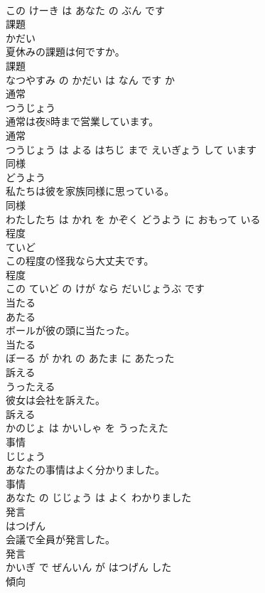 \documentclass[8pt]{extreport}
\begin{document}
\begin{CJK}{UTF8}{min}
\\	この けーき は あなた の ぶん です			
\\	課題	
\\	かだい			
\\	夏休みの課題は何ですか。	
\\	課題 
\\	なつやすみ の かだい は なん です か			
\\	通常	
\\	つうじょう			
\\	通常は夜8時まで営業しています。	
\\	通常 
\\	つうじょう は よる はちじ まで えいぎょう して います			
\\	同様	
\\	どうよう			
\\	私たちは彼を家族同様に思っている。	
\\	同様 
\\	わたしたち は かれ を かぞく どうよう に おもって いる			
\\	程度	
\\	ていど			
\\	この程度の怪我なら大丈夫です。	
\\	程度 
\\	この ていど の けが なら だいじょうぶ です			
\\	当たる	
\\	あたる			
\\	ボールが彼の頭に当たった。	
\\	当たる 
\\	ぼーる が かれ の あたま に あたった			
\\	訴える	
\\	うったえる			
\\	彼女は会社を訴えた。	
\\	訴える 
\\	かのじょ は かいしゃ を うったえた			
\\	事情	
\\	じじょう			
\\	あなたの事情はよく分かりました。	
\\	事情 
\\	あなた の じじょう は よく わかりました			
\\	発言	
\\	はつげん			
\\	会議で全員が発言した。	
\\	発言 
\\	かいぎ で ぜんいん が はつげん した			
\\	傾向	

\end{CJK}
\end{document}
